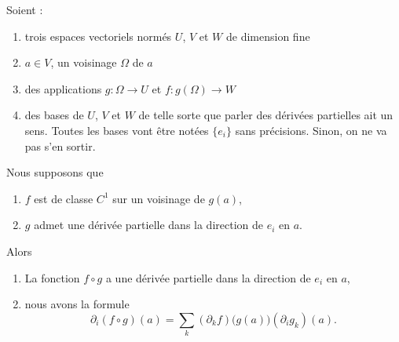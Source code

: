 \begin{theorem}     \label{THOooKBTYooWFtoSF}
    Soient :
    \begin{enumerate}
        \item
            trois espaces vectoriels normés \( U\), \( V\) et \( W\) de dimension fine
        \item
            \( a\in V\), un voisinage \( \Omega\) de \( a\)
        \item
            des applications \( g\colon \Omega\to U\) et \( f\colon g(\Omega)\to W\)
        \item
            des bases de \( U\), \( V\) et \( W\) de telle sorte que parler des dérivées partielles ait un sens. Toutes les bases vont être notées \( \{ e_i \}\) sans précisions. Sinon, on ne va pas s'en sortir.
    \end{enumerate}
    Nous supposons que
    \begin{enumerate}
        \item
            \( f\) est de classe \( C^1\) sur un voisinage de \( g(a)\),
        \item
            \( g\) admet une dérivée partielle dans la direction de \( e_i\) en \( a\).
    \end{enumerate}
    Alors 
    \begin{enumerate}
        \item
            La fonction \( f\circ g\) a une dérivée partielle dans la direction de \( e_i\) en \( a\),
        \item
    nous avons la formule
    \begin{equation}        \label{EQooZMAUooIusxgD}
        \partial_i(f\circ g)(a)=\sum_{k}(\partial_kf)\big( g(a) \big)(\partial_ig_k)(a).
    \end{equation}
    \end{enumerate}
\end{theorem}

